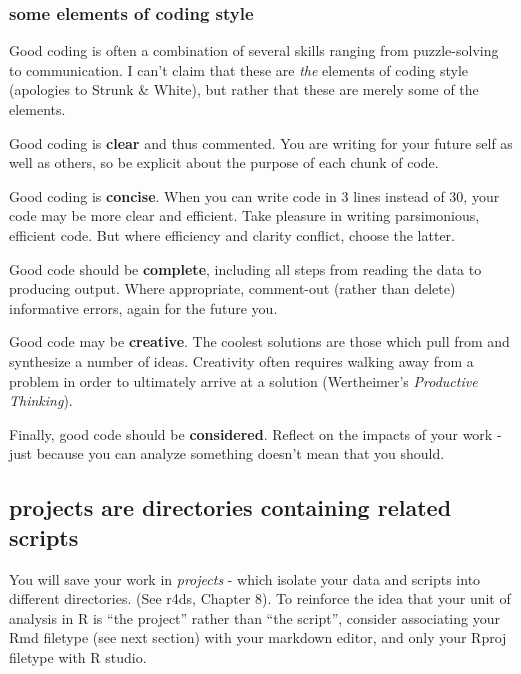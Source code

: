 \documentclass[
]{article}
\begin{document}
\hypertarget{some-elements-of-coding-style}{%
\subsubsection{some elements of coding
style}\label{some-elements-of-coding-style}}

Good coding is often a combination of several skills ranging from
puzzle-solving to communication. I can't claim that these are \emph{the}
elements of coding style (apologies to Strunk \& White), but rather that
these are merely some of the elements.

Good coding is \textbf{clear} and thus commented. You are writing for
your future self as well as others, so be explicit about the purpose of
each chunk of code.

Good coding is \textbf{concise}. When you can write code in 3 lines
instead of 30, your code may be more clear and efficient. Take pleasure
in writing parsimonious, efficient code. But where efficiency and
clarity conflict, choose the latter.

Good code should be \textbf{complete}, including all steps from reading
the data to producing output. Where appropriate, comment-out (rather
than delete) informative errors, again for the future you.

Good code may be \textbf{creative}. The coolest solutions are those
which pull from and synthesize a number of ideas. Creativity often
requires walking away from a problem in order to ultimately arrive at a
solution (Wertheimer's \emph{Productive Thinking}).

Finally, good code should be \textbf{considered}. Reflect on the impacts
of your work - just because you can analyze something doesn't mean that
you should.

\hypertarget{projects-are-directories-containing-related-scripts}{%
\subsection{projects are directories containing related
scripts}\label{projects-are-directories-containing-related-scripts}}

You will save your work in \emph{projects} - which isolate your data and
scripts into different directories. (See r4ds, Chapter 8). To reinforce
the idea that your unit of analysis in R is ``the project'' rather than
``the script'', consider associating your Rmd filetype (see next
section) with your markdown editor, and only your Rproj filetype with R
studio.
\end{document}
